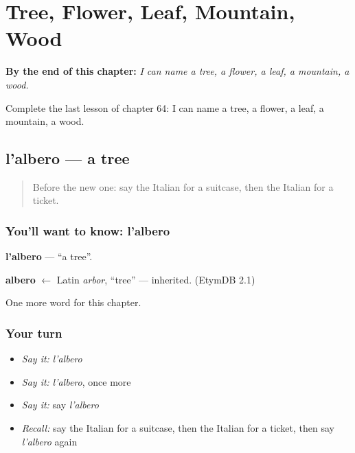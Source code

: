 
\chapter{Tree, Flower, Leaf, Mountain, Wood}
\label{ch:it-tree-flower-leaf-mountain-wood}

\begin{chapteropening}
\textbf{By the end of this chapter:} \emph{I can name a tree, a flower, a leaf, a mountain, a wood.}

Complete the last lesson of chapter 64: I can name a tree, a flower, a leaf, a mountain, a wood.
\end{chapteropening}

\section[l'albero]{l'albero — a tree}

\label{lesson:IT-C64-albero}



\begin{quote}
Before the new one: say the Italian for a suitcase, then the Italian for a ticket.
\end{quote}

\subsection*{You'll want to know: l'albero}
\textbf{l'albero} — \textquotedblleft{}a tree\textquotedblright{}.

\begin{cousinweb}
\textbf{albero} $\leftarrow$ Latin \emph{arbor}, \textquotedblleft{}tree\textquotedblright{} — inherited. (EtymDB 2.1)
\end{cousinweb}

\begin{grammarlens}[title={What you've built}]
One more word for this chapter.
\end{grammarlens}

\subsection*{Your turn}
\begin{itemize}
\raggedright
  \item \emph{Say it:} \emph{l'albero}
  \item \emph{Say it:} \emph{l'albero}, once more
  \item \emph{Say it:} say \emph{l'albero}
  \item \emph{Recall:} say the Italian for a suitcase, then the Italian for a ticket, then say \emph{l'albero} again
\end{itemize}


